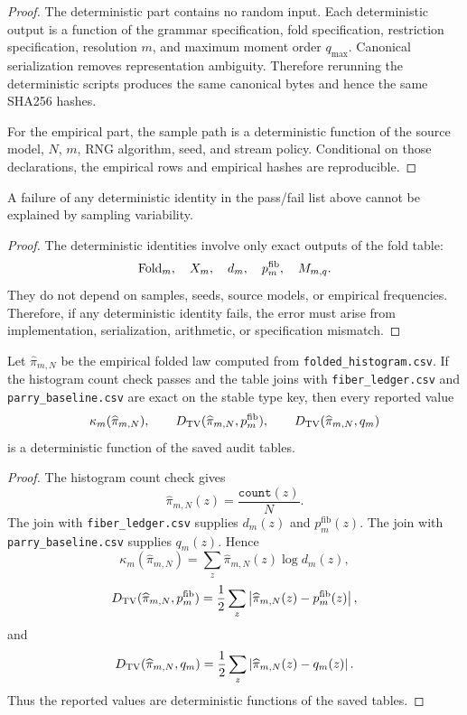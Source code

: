 \begin{proof}
The deterministic part contains no random input.  Each deterministic output is a function of the grammar specification, fold specification, restriction specification, resolution \(m\), and maximum moment order \(q_{\max}\).  Canonical serialization removes representation ambiguity.  Therefore rerunning the deterministic scripts produces the same canonical bytes and hence the same SHA256 hashes.

For the empirical part, the sample path is a deterministic function of the source model, \(N\), \(m\), RNG algorithm, seed, and stream policy.  Conditional on those declarations, the empirical rows and empirical hashes are reproducible.
\end{proof}

\begin{theorem}
\label{thm:deterministic-statistical-separation}
A failure of any deterministic identity in the pass/fail list above cannot be explained by sampling variability.
\end{theorem}

\begin{proof}
The deterministic identities involve only exact outputs of the fold table:
\[
\operatorname{Fold}_m,\quad X_m,\quad d_m,\quad p_m^{\mathrm{fib}},\quad M_{m,q}.
\]
They do not depend on samples, seeds, source models, or empirical frequencies.  Therefore, if any deterministic identity fails, the error must arise from implementation, serialization, arithmetic, or specification mismatch.
\end{proof}

\begin{theorem}
\label{thm:empirical-audit-consistency}
Let \(\widehat\pi_{m,N}\) be the empirical folded law computed from \texttt{folded\_histogram.csv}.  If the histogram count check passes and the table joins with \texttt{fiber\_ledger.csv} and \texttt{parry\_baseline.csv} are exact on the stable type key, then every reported value
\[
\kappa_m(\widehat\pi_{m,N}),\qquad
D_{\mathrm{TV}}(\widehat\pi_{m,N},p_m^{\mathrm{fib}}),\qquad
D_{\mathrm{TV}}(\widehat\pi_{m,N},q_m)
\]
is a deterministic function of the saved audit tables.
\end{theorem}

\begin{proof}
The histogram count check gives
\[
\widehat\pi_{m,N}(z)=\frac{\texttt{count}(z)}{N}.
\]
The join with \texttt{fiber\_ledger.csv} supplies \(d_m(z)\) and \(p_m^{\mathrm{fib}}(z)\).  The join with \texttt{parry\_baseline.csv} supplies \(q_m(z)\).  Hence
\[
\kappa_m(\widehat\pi_{m,N})
=
\sum_z\widehat\pi_{m,N}(z)\log d_m(z),
\]
\[
D_{\mathrm{TV}}(\widehat\pi_{m,N},p_m^{\mathrm{fib}})
=
\frac12\sum_z\left|\widehat\pi_{m,N}(z)-p_m^{\mathrm{fib}}(z)\right|,
\]
and
\[
D_{\mathrm{TV}}(\widehat\pi_{m,N},q_m)
=
\frac12\sum_z\left|\widehat\pi_{m,N}(z)-q_m(z)\right|.
\]
Thus the reported values are deterministic functions of the saved tables.
\end{proof}

